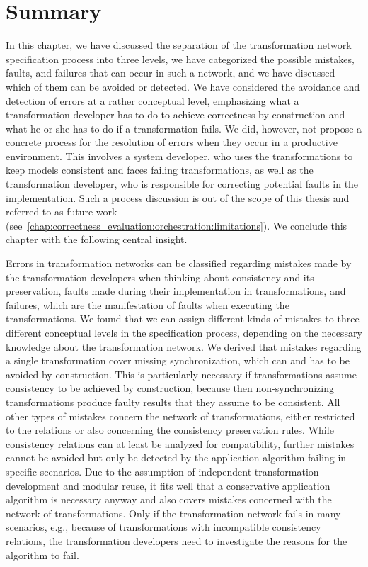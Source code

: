 \section{Summary}

In this chapter, we have discussed the separation of the transformation network specification process into three levels, we have categorized the possible mistakes, faults, and failures that can occur in such a network, and we have discussed which of them can be avoided or detected.
We have considered the avoidance and detection of errors at a rather conceptual level, emphasizing what a transformation developer has to do to achieve correctness by construction and what he or she has to do if a transformation fails.
We did, however, not propose a concrete process for the resolution of errors when they occur in a productive environment.
This involves a system developer, who uses the transformations to keep models consistent and faces failing transformations, as well as the transformation developer, who is responsible for correcting potential faults in the implementation.
Such a process discussion is out of the scope of this thesis and referred to as future work (see~\autoref{chap:correctness_evaluation:orchestration:limitations}).
We conclude this chapter with the following central insight.

\begin{insight}[Errors]
    Errors in transformation networks can be classified regarding mistakes made by the transformation developers when thinking about consistency and its preservation, faults made during their implementation in transformations, and failures, which are the manifestation of faults when executing the transformations.
    We found that we can assign different kinds of mistakes to three different conceptual levels in the specification process, depending on the necessary knowledge about the transformation network.
    We derived that mistakes regarding a single transformation cover missing synchronization, which can and has to be avoided by construction.
    This is particularly necessary if transformations assume consistency to be achieved by construction, because then non-synchronizing transformations produce faulty results that they assume to be consistent.
    All other types of mistakes concern the network of transformations, either restricted to the relations or also concerning the consistency preservation rules.
    While consistency relations can at least be analyzed for compatibility, further mistakes cannot be avoided but only be detected by the application algorithm failing in specific scenarios.
    Due to the assumption of independent transformation development and modular reuse, it fits well that a conservative application algorithm is necessary anyway and also covers mistakes concerned with the network of transformations.
    Only if the transformation network fails in many scenarios, e.g., because of transformations with incompatible consistency relations, the transformation developers need to investigate the reasons for the algorithm to fail.
\end{insight}
